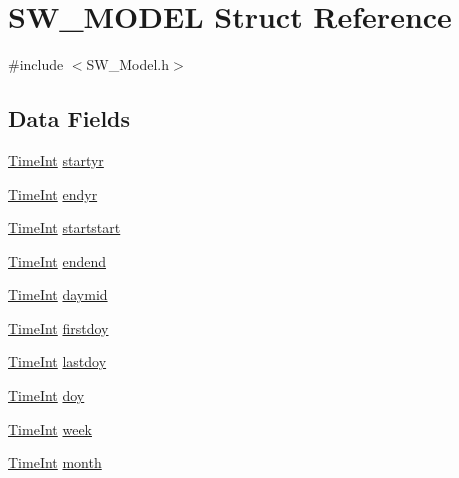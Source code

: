 \hypertarget{struct_s_w___m_o_d_e_l}{}\section{S\+W\+\_\+\+M\+O\+D\+EL Struct Reference}
\label{struct_s_w___m_o_d_e_l}


{\ttfamily \#include $<$S\+W\+\_\+\+Model.\+h$>$}

\subsection*{Data Fields}
\begin{DoxyCompactItemize}
\item 
\hyperlink{_times_8h_a25ac787161a5cad0e3fdfe5a5aeb3236}{Time\+Int} \hyperlink{struct_s_w___m_o_d_e_l_a372a89e152904bcc59481c87fe51b0ad}{startyr}
\item 
\hyperlink{_times_8h_a25ac787161a5cad0e3fdfe5a5aeb3236}{Time\+Int} \hyperlink{struct_s_w___m_o_d_e_l_abed13a93f428ea87c32446b0a2ba362e}{endyr}
\item 
\hyperlink{_times_8h_a25ac787161a5cad0e3fdfe5a5aeb3236}{Time\+Int} \hyperlink{struct_s_w___m_o_d_e_l_acc7f14d03928972cab78b3bd83d0d68c}{startstart}
\item 
\hyperlink{_times_8h_a25ac787161a5cad0e3fdfe5a5aeb3236}{Time\+Int} \hyperlink{struct_s_w___m_o_d_e_l_ac1202a2b77de0209a9639ae983875b90}{endend}
\item 
\hyperlink{_times_8h_a25ac787161a5cad0e3fdfe5a5aeb3236}{Time\+Int} \hyperlink{struct_s_w___m_o_d_e_l_ab3c5fd1e0009d8cb42bda44103a5d22f}{daymid}
\item 
\hyperlink{_times_8h_a25ac787161a5cad0e3fdfe5a5aeb3236}{Time\+Int} \hyperlink{struct_s_w___m_o_d_e_l_a4dcb1794a7e84fad27c836311346dd6c}{firstdoy}
\item 
\hyperlink{_times_8h_a25ac787161a5cad0e3fdfe5a5aeb3236}{Time\+Int} \hyperlink{struct_s_w___m_o_d_e_l_a89974c4aa01556a7be50acd29689953e}{lastdoy}
\item 
\hyperlink{_times_8h_a25ac787161a5cad0e3fdfe5a5aeb3236}{Time\+Int} \hyperlink{struct_s_w___m_o_d_e_l_a2fd6957c498589e9208edaac093808ea}{doy}
\item 
\hyperlink{_times_8h_a25ac787161a5cad0e3fdfe5a5aeb3236}{Time\+Int} \hyperlink{struct_s_w___m_o_d_e_l_a232972133f960d8fa900b0c26fbf4445}{week}
\item 
\hyperlink{_times_8h_a25ac787161a5cad0e3fdfe5a5aeb3236}{Time\+Int} \hyperlink{struct_s_w___m_o_d_e_l_a10500242c8b247ea53a1f55c1e099450}{month}

\end{DoxyCompactItemize}
